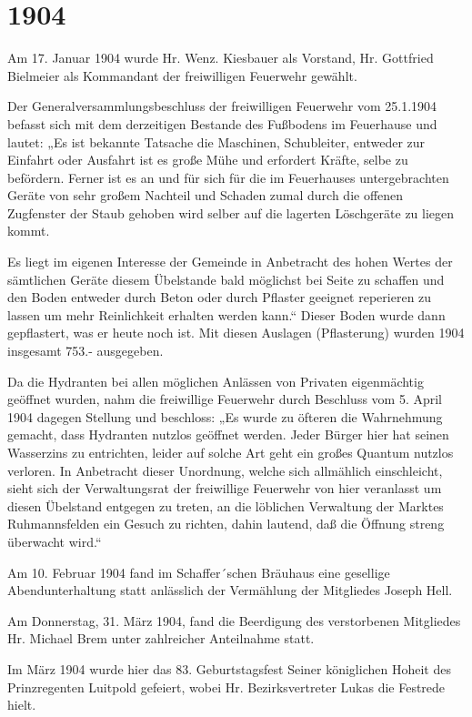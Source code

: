 \documentclass[12pt,a4paper]{book}
\begin{document}
\section*{1904}

Am 17. Januar 1904 wurde Hr. Wenz. Kiesbauer als Vorstand, Hr. Gottfried
Bielmeier als Kommandant der freiwilligen Feuerwehr gewählt.

Der Generalversammlungsbeschluss der freiwilligen Feuerwehr vom 25.1.1904
befasst sich mit dem derzeitigen Bestande des Fußbodens im Feuerhause und
lautet: „Es ist bekannte Tatsache die Maschinen, Schubleiter, entweder zur
Einfahrt oder Ausfahrt ist es große Mühe und erfordert Kräfte, selbe zu
befördern. Ferner ist es an und für sich für die im Feuerhauses untergebrachten
Geräte von sehr großem Nachteil und Schaden zumal durch die offenen Zugfenster
der Staub gehoben wird selber auf die lagerten Löschgeräte zu liegen kommt.

Es liegt im eigenen Interesse der Gemeinde in Anbetracht des hohen Wertes der
sämtlichen Geräte diesem Übelstande bald möglichst bei Seite zu schaffen und den
Boden entweder durch Beton oder durch Pflaster geeignet reperieren zu lassen um
mehr Reinlichkeit erhalten werden kann.“ Dieser Boden wurde dann gepflastert,
was er heute noch ist. Mit diesen Auslagen (Pflasterung) wurden 1904 insgesamt
753.- ausgegeben.

Da die Hydranten bei allen möglichen Anlässen von Privaten eigenmächtig geöffnet
wurden, nahm die freiwillige Feuerwehr durch Beschluss vom 5. April 1904 dagegen
Stellung und beschloss: „Es wurde zu öfteren die Wahrnehmung gemacht, dass
Hydranten nutzlos geöffnet werden. Jeder Bürger hier hat seinen Wasserzins zu
entrichten, leider auf solche Art geht ein großes Quantum nutzlos verloren. In
Anbetracht dieser Unordnung, welche sich allmählich einschleicht, sieht sich der
Verwaltungsrat der freiwillige Feuerwehr von hier veranlasst um diesen Übelstand
entgegen zu treten, an die löblichen Verwaltung der Marktes Ruhmannsfelden ein
Gesuch zu richten, dahin lautend, daß die Öffnung streng überwacht wird.“

Am 10. Februar 1904 fand im Schaffer´schen Bräuhaus eine gesellige
Abendunterhaltung statt anlässlich der Vermählung der Mitgliedes Joseph Hell.

Am Donnerstag, 31. März 1904, fand die Beerdigung des verstorbenen Mitgliedes
Hr. Michael Brem unter zahlreicher Anteilnahme statt.

Im März 1904 wurde hier das 83. Geburtstagsfest Seiner königlichen Hoheit des
Prinzregenten Luitpold gefeiert, wobei Hr. Bezirksvertreter Lukas die Festrede
hielt.
\end{document}
